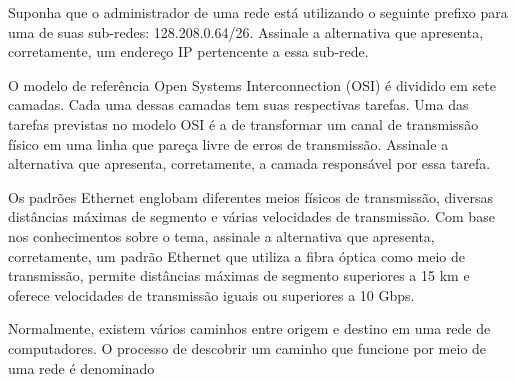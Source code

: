\documentclass[10pt,a4paper]{article}
\begin{document}
%
{
\def\AMCbeginQuestion#1#2{\par\noindent{\bf (POSCOMP 2014 - Questão 54)}}
\begin{question}{} Suponha que o administrador de uma rede está utilizando o seguinte prefixo para uma de suas sub-redes: 128.208.0.64/26. Assinale a alternativa que apresenta, corretamente, um endereço IP pertencente a essa sub-rede.
\begin{choices}
\end{choices}
\end{question}
}
%
{
\def\AMCbeginQuestion#1#2{\par\noindent{\bf (POSCOMP 2014 - Questão 60)}}
\begin{question}{} O modelo de referência Open Systems Interconnection (OSI) é dividido em sete camadas. Cada uma dessas camadas tem suas respectivas tarefas. Uma das tarefas previstas no modelo OSI é a de transformar um canal de transmissão físico em uma linha que pareça livre de erros de transmissão. Assinale a alternativa que apresenta, corretamente, a camada responsável por essa tarefa.
\begin{choices}
\end{choices}
\end{question}
}
%
{
\def\AMCbeginQuestion#1#2{\par\noindent{\bf (POSCOMP 2014 - Questão 65)}}
\begin{question}{} Os padrões Ethernet englobam diferentes meios físicos de transmissão, diversas distâncias máximas de segmento e várias velocidades de transmissão. Com base nos conhecimentos sobre o tema, assinale a alternativa que apresenta, corretamente, um padrão Ethernet que utiliza a fibra óptica como meio de transmissão, permite distâncias máximas de segmento superiores a 15 km e oferece velocidades de transmissão iguais ou superiores a 10 Gbps.
\begin{choices}
\end{choices}
\end{question}
}
%
{
\def\AMCbeginQuestion#1#2{\par\noindent{\bf (POSCOMP 2015 - Questão 54)}}
\begin{question}{} Normalmente, existem vários caminhos entre origem e destino em uma rede de computadores. O processo de descobrir um caminho que funcione por meio de uma rede é denominado
\begin{choices}
\end{choices}
\end{question}
}
\end{document}
